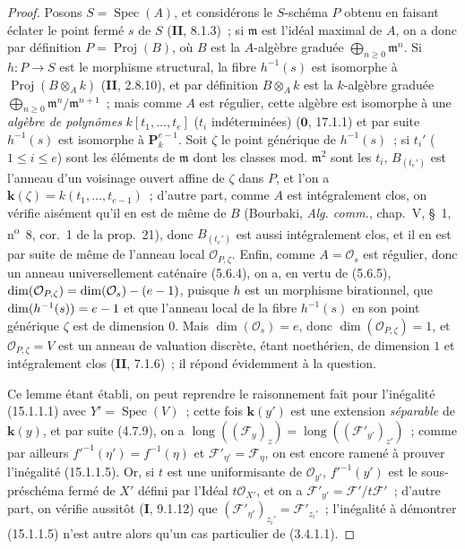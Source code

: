 \begin{proof}
Posons $S=\operatorname{Spec}(A)$, et considérons le $S$-schéma $P$ obtenu en
faisant éclater le point fermé $s$ de $S$ (\textbf{II}, 8.1.3)~; si $\mathfrak m$
est l'idéal maximal de $A$, on a donc par définition
$P=\operatorname{Proj}(B)$, où $B$ est la $A$-algèbre graduée
$\bigoplus_{n\geqslant0}\mathfrak m^n$. Si $h:P\to S$ est le morphisme
structural, la fibre $h^{-1}(s)$ est isomorphe à
$\operatorname{Proj}(B\otimes_A k)$ (\textbf{II}, 2.8.10), et par définition
$B\otimes_A k$ est la $k$-algèbre graduée
$\bigoplus_{n\geqslant0}\mathfrak m^n/\mathfrak m^{n+1}$~; mais comme $A$ est
régulier, cette algèbre est isomorphe à une \emph{algèbre de polynômes}
$k[t_1,\ldots,t_e]$ ($t_i$ indéterminées) ($\mathbf{0}$, 17.1.1)
et par suite $h^{-1}(s)$ est isomorphe à $\mathbf P_k^{e-1}$. Soit $\zeta$ le
point générique de $h^{-1}(s)$~; si $t_i'$ ($1\leqslant i\leqslant e$) sont les
éléments de $\mathfrak m$ dont les classes mod. $\mathfrak m^2$ sont les $t_i$,
$B_{(t_e')}$ est l'anneau d'un voisinage ouvert affine de $\zeta$ dans $P$, et
l'on a $\boldsymbol{k}(\zeta)=k(t_1,\ldots,t_{e-1})$~; d'autre part, comme $A$ est
intégralement clos, on vérifie aisément qu'il en est de même de $B$ (Bourbaki,
\emph{Alg. comm.}, chap.~V, \S~1, n\textsuperscript{o}~8, cor.~1 de la prop.~21),
donc $B_{(t_e')}$ est aussi intégralement clos, et il en est par suite de même de
l'anneau local $\mathcal O_{P,\zeta}$. Enfin, comme $A=\mathcal O_s$ est
régulier, donc un anneau universellement caténaire (5.6.4), on a, en vertu de
(5.6.5),
$\dim(\mathcal O_{P,\zeta})=\dim(\mathcal O_s)-(e- 1)$, puisque $h$ est un
morphisme birationnel, que $\dim(h^{-1}(s))=e- 1$ et que l'anneau local de la
fibre $h^{-1}(s)$ en son point générique $\zeta$ est de dimension $0$. Mais
$\dim(\mathcal O_s)=e$, donc $\dim(\mathcal O_{P,\zeta})=1$, et
$\mathcal O_{P,\zeta}=V$ est un anneau de valuation discrète, étant noethérien,
de dimension $1$ et intégralement clos (\textbf{II}, 7.1.6)~; il répond
évidemment à la question.

Ce lemme étant établi, on peut reprendre le raisonnement fait pour l'inégalité
(15.1.1.1) avec $Y'=\operatorname{Spec}(V)$~; cette fois $\boldsymbol{k}(y')$ est
une extension \emph{séparable} de $\boldsymbol{k}(y)$, et par suite (4.7.9), on a
$\operatorname{long}((\mathcal F_y)_z)=
\operatorname{long}((\mathcal F'_{y'})_{z'})$~; comme par ailleurs
$f'^{-1}(\eta')=f^{-1}(\eta)$ et $\mathcal F'_{\eta'}=\mathcal F_\eta$, on est
encore ramené à prouver l'inégalité (15.1.1.5). Or, si $t$ est une uniformisante
de $\mathcal O_{y'}$, $f'^{-1}(y')$ est le sous-préschéma fermé de $X'$ défini
par l'Idéal $t\mathcal O_{X'}$, et on a
$\mathcal F'_{y'}=\mathcal F'/t\mathcal F'$~; d'autre part, on vérifie aussitôt
(\textbf{I}, 9.1.12) que
$(\mathcal F'_{\eta'})_{z_i'}=\mathcal F'_{z_i'}$~; l'inégalité à démontrer
(15.1.1.5) n'est autre alors qu'un cas particulier de (3.4.1.1).
\end{proof}

